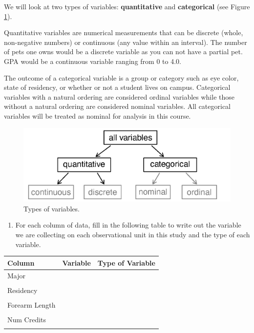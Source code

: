 \documentclass[
]{report}
\providecommand{\tightlist}{%
  \setlength{\itemsep}{0pt}\setlength{\parskip}{0pt}}
\begin{document}
We will look at two types of variables: \textbf{quantitative} and \textbf{categorical} (see Figure \ref{fig:types-of-variables}).

Quantitative variables are numerical measurements that can be discrete (whole, non-negative numbers) or continuous (any value within an interval). The number of pets one owns would be a discrete variable as you can not have a partial pet. GPA would be a continuous variable ranging from 0 to 4.0.

The outcome of a categorical variable is a group or category such as eye color, state of residency, or whether or not a student lives on campus. Categorical variables with a natural ordering are considered ordinal variables while those without a natural ordering are considered nominal variables. All categorical variables will be treated as nominal for analysis in this course.

\begin{figure}

{\centering \includegraphics[width=0.5\linewidth]{images/variables} 

}

\caption{Types of variables.}\label{fig:types-of-variables}
\end{figure}

\newpage

\begin{enumerate}
\def\labelenumi{\arabic{enumi}.}
\setcounter{enumi}{2}
\tightlist
\item
  For each column of data, fill in the following table to write out the variable we are collecting on each observational unit in this study and the type of each variable.
\end{enumerate}

\begin{center}
\begin{tabular}{|l|p{2in}|p{2in}|} \hline
Column & Variable & Type of Variable  \\ \hline
Major & & \\ 
& & \\ \hline
Residency & & \\ 
& & \\ \hline
Forearm Length & & \\ 
& & \\ \hline
Num Credits & & \\ 
& & \\ \hline
\end{tabular}
\end{center}
\end{document}
